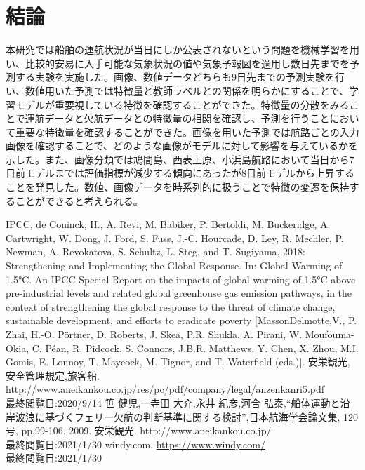 \documentclass[twocolumn,twoside,9.5pt]{jsarticle}
\begin{document}
\section{結論}
本研究では船舶の運航状況が当日にしか公表されないという問題を機械学習を用い、比較的安易に入手可能な気象状況の値や気象予報図を適用し数日先までを予測する実験を実施した。画像、数値データどちらも9日先までの予測実験を行い、数値用いた予測では特徴量と教師ラベルとの関係を明らかにすることで、学習モデルが重要視している特徴を確認することができた。特徴量の分散をみることで運航データと欠航データとの特徴量の相関を確認し、予測を行うことにおいて重要な特徴量を確認することができた。画像を用いた予測では航路ごとの入力画像を確認することで、どのような画像がモデルに対して影響を与えているかを示した。また、画像分類では鳩間島、西表上原、小浜島航路において当日から7日前モデルまでは評価指標が減少する傾向にあったが8日前モデルから上昇することを発見した。数値、画像データを時系列的に扱うことで特徴の変遷を保持することができると考えられる。

\thispagestyle{fancy}
\begin{thebibliography}{9}

IPCC, de Coninck, H., A. Revi, M. Babiker, P. Bertoldi, M. Buckeridge, A. Cartwright, W. Dong, J. Ford, S. Fuss, J.-C. Hourcade, D. Ley, R. Mechler, P. Newman, A. Revokatova, S. Schultz, L. Steg, and T. Sugiyama, 2018: Strengthening and Implementing the Global Response. In: Global Warming of 1.5°C. An IPCC Special Report on the impacts of global warming of 1.5°C above pre-industrial levels and related global greenhouse gas emission pathways, in the context of strengthening the global response to the threat of climate change, sustainable development, and efforts to eradicate poverty [MassonDelmotte,V., P. Zhai, H.-O. P\"{o}rtner, D. Roberts, J. Skea, P.R. Shukla, A. Pirani, W. Moufouma-Okia, C. P\'{e}an, R. Pidcock, S. Connors, J.B.R. Matthews, Y. Chen, X. Zhou, M.I. Gomis, E. Lonnoy, T. Maycock, M. Tignor, and T. Waterfield (eds.)]. 
安栄観光,安全管理規定,旅客船. \\ \url{http://www.aneikankou.co.jp/res/pc/pdf/company/legal/anzenkanri5.pdf} \\最終閲覧日:2020/9/14
 笹 健児,一寺田 大介,永井 紀彦,河合 弘泰,``船体運動と沿岸波浪に基づくフェリー欠航の判断基準に関する検討'',日本航海学会論文集, 120号, pp.99-106, 2009.
 安栄観光. http://www.aneikankou.co.jp/ \\最終閲覧日:2021/1/30
windy.com. \url{https://www.windy.com/} \\最終閲覧日:2021/1/30

\end{thebibliography}
\end{document}
